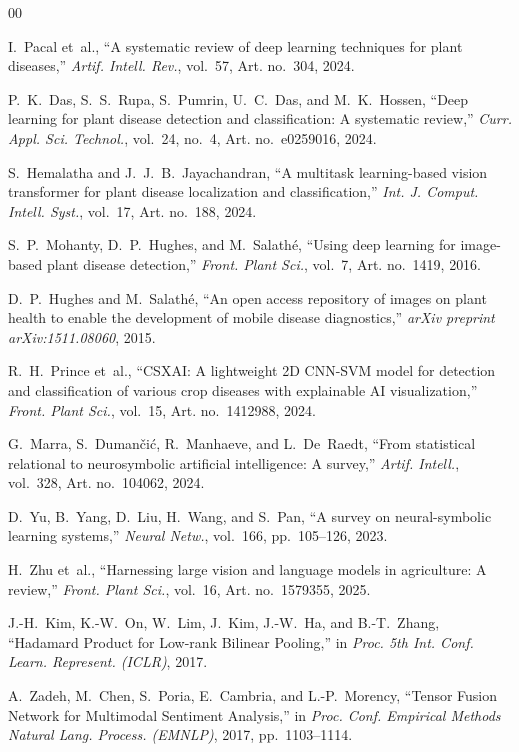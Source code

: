 \documentclass[conference]{IEEEtran}
\begin{document}
\begin{thebibliography}{00}

I.~Pacal et~al., ``A systematic review of deep learning techniques for plant diseases,'' \textit{Artif. Intell. Rev.}, vol.~57, Art. no.~304, 2024.

P.~K.~Das, S.~S.~Rupa, S.~Pumrin, U.~C.~Das, and M.~K.~Hossen, ``Deep learning for plant disease detection and classification: A systematic review,'' \textit{Curr. Appl. Sci. Technol.}, vol.~24, no.~4, Art. no.~e0259016, 2024.

S.~Hemalatha and J.~J.~B.~Jayachandran, ``A multitask learning-based vision transformer for plant disease localization and classification,'' \textit{Int. J. Comput. Intell. Syst.}, vol.~17, Art. no.~188, 2024.

S.~P.~Mohanty, D.~P.~Hughes, and M.~Salath{\'e}, ``Using deep learning for image-based plant disease detection,'' \textit{Front. Plant Sci.}, vol.~7, Art. no.~1419, 2016.

D.~P.~Hughes and M.~Salath{\'e}, ``An open access repository of images on plant health to enable the development of mobile disease diagnostics,'' \textit{arXiv preprint arXiv:1511.08060}, 2015.

R.~H.~Prince et~al., ``CSXAI: A lightweight 2D CNN-SVM model for detection and classification of various crop diseases with explainable AI visualization,'' \textit{Front. Plant Sci.}, vol.~15, Art. no.~1412988, 2024.

G.~Marra, S.~Duman{\v{c}}i{\'c}, R.~Manhaeve, and L.~De~Raedt, ``From statistical relational to neurosymbolic artificial intelligence: A survey,'' \textit{Artif. Intell.}, vol.~328, Art. no.~104062, 2024.

D.~Yu, B.~Yang, D.~Liu, H.~Wang, and S.~Pan, ``A survey on neural-symbolic learning systems,'' \textit{Neural Netw.}, vol.~166, pp.~105--126, 2023.

H.~Zhu et~al., ``Harnessing large vision and language models in agriculture: A review,'' \textit{Front. Plant Sci.}, vol.~16, Art. no.~1579355, 2025.

J.-H.~Kim, K.-W.~On, W.~Lim, J.~Kim, J.-W.~Ha, and B.-T.~Zhang, ``Hadamard Product for Low-rank Bilinear Pooling,'' in \textit{Proc. 5th Int. Conf. Learn. Represent. (ICLR)}, 2017.

A.~Zadeh, M.~Chen, S.~Poria, E.~Cambria, and L.-P.~Morency, ``Tensor Fusion Network for Multimodal Sentiment Analysis,'' in \textit{Proc. Conf. Empirical Methods Natural Lang. Process. (EMNLP)}, 2017, pp.~1103--1114.


\end{thebibliography}
\end{document}
